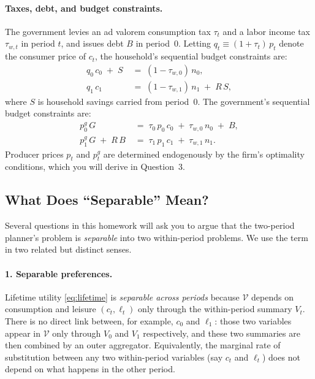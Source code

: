 \paragraph{Taxes, debt, and budget constraints.}
The government levies an ad valorem consumption tax $\tau_t$ and a labor income tax $\tau_{w,t}$ in period $t$, and issues debt $B$ in period~0. Letting $q_t \equiv (1+\tau_t)\,p_t$ denote the consumer price of $c_t$, the household's sequential budget constraints are:
%
\begin{align}
    q_0\, c_0 \;+\; S &\;=\; (1-\tau_{w,0})\, n_0,
    \label{eq:hh0} \\
    q_1\, c_1 &\;=\; (1-\tau_{w,1})\, n_1 \;+\; R\,S,
    \label{eq:hh1}
\end{align}
%
where $S$ is household savings carried from period~0. The government's sequential budget constraints are:
%
\begin{align}
    p_0^g\, G &\;=\; \tau_0\, p_0\, c_0 \;+\; \tau_{w,0}\, n_0 \;+\; B,
    \label{eq:gov0} \\
    p_1^g\, G \;+\; R\,B &\;=\; \tau_1\, p_1\, c_1 \;+\; \tau_{w,1}\, n_1.
    \label{eq:gov1}
\end{align}
%
Producer prices $p_t$ and $p_t^g$ are determined endogenously by the firm's optimality conditions, which you will derive in Question~3.
 
\subsection{What Does ``Separable'' Mean?}
\label{subsec:separable}
 
Several questions in this homework will ask you to argue that the two-period planner's problem is \emph{separable} into two within-period problems. We use the term in two related but distinct senses.
 
\paragraph{1. Separable preferences.}
Lifetime utility \eqref{eq:lifetime} is \emph{separable across periods} because $\mathcal{V}$ depends on consumption and leisure $(c_t, \ell_t)$ only through the within-period summary $V_t$. There is no direct link between, for example, $c_0$ and $\ell_1$: those two variables appear in $\mathcal{V}$ only through $V_0$ and $V_1$ respectively, and these two summaries are then combined by an outer aggregator. Equivalently, the marginal rate of substitution between any two within-period variables (say $c_t$ and $\ell_t$) does not depend on what happens in the other period.
 
